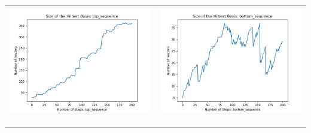 \documentclass[10pt]{article}
\begin{document}
\begin{tabular}{c|c}
\begin{minipage}{.45\textwidth}
\includegraphics[width=\textwidth]{"DATA/5d/5 generators 2 bound E/top_sequence SIZE"}
\end{minipage} &
\begin{minipage}{.45\textwidth}
\includegraphics[width=\textwidth]{"DATA/5d/5 generators 2 bound E bottomup/bottom_sequence SIZE"}
\end{minipage} \\ \\
\hline \\\begin{minipage}{.45\textwidth}

\end{minipage}
\end{tabular}
\end{document}

